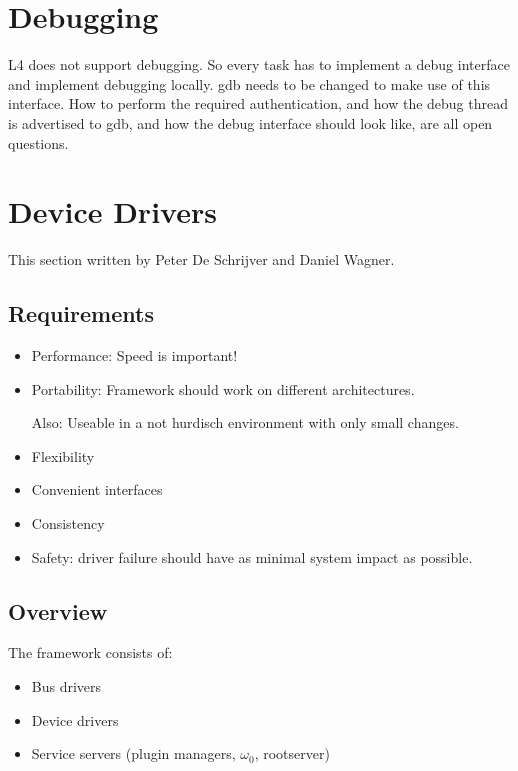 \documentclass[9pt,a4paper]{extarticle}
\begin{document}
\section{Debugging}
\label{debug}

L4 does not support debugging.  So every task has to implement a debug
interface and implement debugging locally.  gdb needs to be changed to
make use of this interface.  How to perform the required
authentication, and how the debug thread is advertised to gdb, and how
the debug interface should look like, are all open questions.


\section{Device Drivers}

This section written by Peter De Schrijver and Daniel Wagner.

\subsection{Requirements}

  \begin{itemize}
  \item Performance: Speed is important!
  \item Portability: Framework should work on different architectures.
    
    Also: Useable in a not hurdisch environment with only
    small changes.

  \item Flexibility
  \item Convenient interfaces
  \item Consistency 
  \item Safety: driver failure should have as minimal system impact as
    possible.
  \end{itemize}

\subsection{Overview}

 The framework consists of: 
 \begin{itemize}
 \item Bus drivers
 \item Device drivers
 \item Service servers (plugin managers, $\omega_0$, rootserver)
 \end{itemize}
\end{document}
